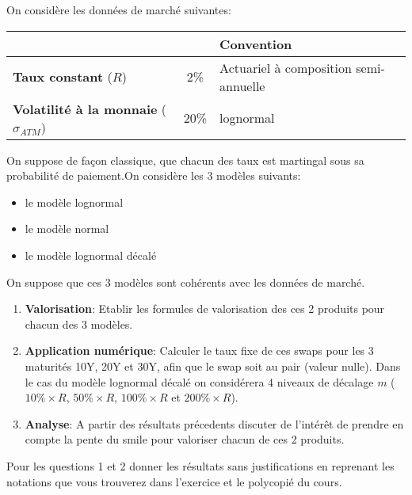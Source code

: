 \documentclass{article}
\begin{document}
\vspace{0.5cm}

On considère les données de marché suivantes:\\
\begin{tabular}{|l|c|l|}
\hline
&&\textbf{Convention}\\
\hline
\textbf{Taux constant} ($R$) & 2\%&Actuariel à composition semi-annuelle\\
\hline
\textbf{Volatilité à la monnaie} ($\sigma_{ATM}$)&20\%&lognormal \\
\hline
\end{tabular}

\vspace{0.5cm}

On suppose de façon classique, que chacun des taux est martingal sous sa probabilité de paiement.On considère les 3 modèles suivants:
\begin{itemize}
\item le modèle lognormal
\item le modèle normal
\item le modèle lognormal décalé
\end{itemize}
\vspace{0.5cm}
On suppose que ces 3 modèles sont cohérents avec les données de marché.
\begin{enumerate}
\item \textbf{Valorisation}: Etablir les formules de valorisation des ces 2 produits pour chacun des 3 modèles.
\item \textbf{Application numérique}: Calculer le taux fixe de ces swaps pour les 3 maturités 10Y, 20Y et 30Y, afin que le swap soit au pair (valeur nulle). Dans le cas du modèle lognormal décalé on considérera 4 niveaux de décalage $m$ ($10\% \times R$, $50\% \times R$, $100\% \times R$ et $200\% \times R$).
\item \textbf{Analyse}: A partir des résultats précedents discuter de l'intérêt de prendre en compte la pente du smile pour valoriser chacun de ces 2 produits. 
\end{enumerate}
Pour les questions 1 et 2 donner les résultats sans justifications en reprenant les notations que vous trouverez dans l'exercice et le polycopié du cours.
\end{document}

